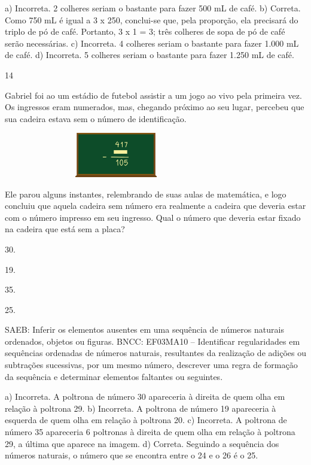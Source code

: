\begin{multicols}{2}
{\begin{escolha}
{a) Incorreta. 2 colheres seriam o bastante para fazer 500 mL de café.
b) Correta. Como 750 mL é igual a 3 x 250, conclui-se que, pela proporção, ela
precisará do triplo de pó de café. Portanto, 3 x 1 = 3; três colheres de sopa de pó de café serão necessárias.
c) Incorreta. 4 colheres seriam o bastante para fazer 1.000 mL de café.
d) Incorreta. 5 colheres seriam o bastante para fazer 1.250 mL de café.

\num{14}

Gabriel foi ao um estádio de futebol assistir a um jogo ao vivo pela primeira vez. Os ingressos eram numerados, mas, chegando próximo ao seu
lugar, percebeu que sua cadeira estava sem o número de identificação.


\includegraphics[width=3.87534in,height=0.76673in]{media/image122.png}

Ele parou alguns instantes, relembrando de suas aulas de matemática, e logo concluiu que aquela cadeira sem número era realmente a cadeira que deveria estar com o número impresso em seu ingresso. Qual o número que
deveria estar fixado na cadeira que está sem a placa?

\begin{escolha}
\item
  30.
\item
  19.
\item
  35.
\item
  25.
\end{escolha}

SAEB: Inferir os elementos ausentes em uma sequência de
números naturais ordenados, objetos ou figuras.
BNCC: EF03MA10 -- Identificar regularidades em sequências ordenadas de números naturais,
resultantes da realização de adições ou subtrações sucessivas, por um mesmo número,
descrever uma regra de formação da sequência e determinar elementos faltantes ou seguintes.

a) Incorreta. A poltrona de número 30 apareceria à direita de quem olha em relação à poltrona 29.
b) Incorreta. A poltrona de número 19 apareceria à esquerda de quem olha em relação à poltrona 20.
c) Incorreta. A poltrona de número 35 apareceria  6 poltronas à direita de quem olha em relação à poltrona 29, a última que aparece na imagem.
d) Correta. Seguindo a sequência dos números naturais, o número que se encontra entre o 24 e o 26 é o 25.

}
\end{escolha}}
\end{multicols}
